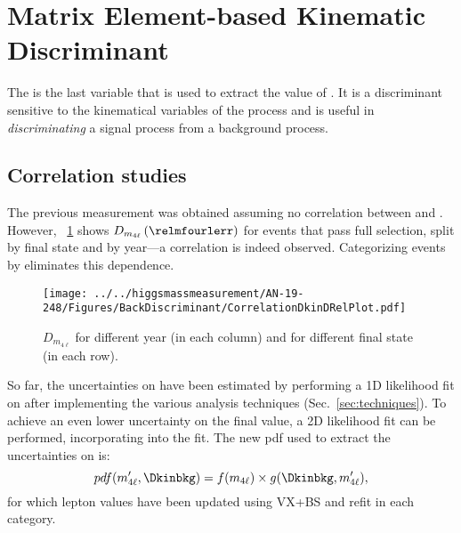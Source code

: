 \section{Matrix Element-based Kinematic Discriminant}
\label{sec:Dkin}
The \Dkinbkg is the last variable that is used to extract the value of \mH.
It is a discriminant sensitive to the kinematical variables of the \qqggzzfourl process and is useful in \emph{discriminating} a signal process from a background process.


\subsection{Correlation studies}
\label{sec:DkinCorrelation}
The previous \mH measurement
was obtained assuming no correlation between \relmfourlerrflat and \Dkinbkg.
However, \figurename~\ref{Dkin_sigma_correlation} shows $D_{m_{4\ell}} \left( \relmfourlerr \right)$ \vs \Dkinbkg for events that pass full selection, split by final state and by year---a correlation is indeed observed.
Categorizing events by \relmfourlerrflat eliminates this dependence.
\begin{figure}[!htbp]
\begin{center}
	\texttt{[image: ../../higgsmassmeasurement/AN-19-248/Figures/BackDiscriminant/CorrelationDkinDRelPlot.pdf]}
\caption{$D_{m_{4\ell}}$ \vs \Dkinbkg for different year (in each column) and for different final state (in each row).}
\label{Dkin_sigma_correlation}
\end{center}
\end{figure}

So far, the uncertainties on \mH have been estimated by performing a 1D likelihood fit on \mfourl after implementing the various analysis techniques (Sec.~\ref{sec:techniques}).
To achieve an even lower uncertainty on the final \mH value, a 2D likelihood fit can be performed, incorporating \Dkinbkg into the fit.
The new pdf used to extract the uncertainties on \mH is:
\[
pdf(m'_{4\ell}, \Dkinbkg) = f(m_{4\ell}) \times g(\Dkinbkg, m'_{4\ell}),
\]
for which lepton \pt values have been updated using VX+BS and \Zone refit in each category.

